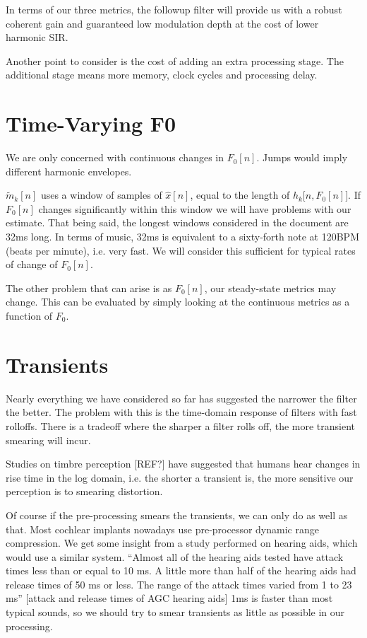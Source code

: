 \documentclass [11pt, proquest] {uwthesis}[2015/03/03]
\begin{document}
In terms of our three metrics, the followup filter will provide us with a robust coherent gain and guaranteed low modulation depth at the cost of lower harmonic SIR.

Another point to consider is the cost of adding an extra processing stage.  The additional stage means more memory, clock cycles and processing delay.


\section{Time-Varying F0}

We are only concerned with continuous changes in $F_0[n]$.  Jumps would imply different harmonic envelopes.

$\tilde{m}_k[n]$ uses a window of samples of $\widehat{x}[n]$, equal to the length of $h_k\big[n,F_0[n]\big]$.  If $F_0[n]$ changes significantly within this window we will have problems with our estimate.  That being said, the longest windows considered in the document are 32ms long.  In terms of music, 32ms is equivalent to a sixty-forth note at 120BPM (beats per minute), i.e. very fast.  We will consider this sufficient for typical rates of change of $F_0[n]$.

The other problem that can arise is as $F_0[n]$, our steady-state metrics may change.  This can be evaluated by simply looking at the continuous metrics as a function of $F_0$.

\section{Transients}\label{section:transients}

Nearly everything we have considered so far has suggested the narrower the filter the better.  The problem with this is the time-domain response of filters with fast rolloffs.  There is a tradeoff where the sharper a filter rolls off, the more transient smearing will incur.

Studies on timbre perception [REF?] have suggested that humans hear changes in rise time in the log domain, i.e. the shorter a transient is, the more sensitive our perception is to smearing distortion.

Of course if the pre-processing smears the transients, we can only do as well as that.  Most cochlear implants nowadays use pre-processor dynamic range compression.  We get some insight from a study performed on hearing aids, which would use a similar system.  ``Almost all of the hearing aids tested have attack times less than or equal to 10 ms. A little more than half of the hearing aids had release times of 50 ms or less.  The range of the attack times varied from 1 to 23 ms'' [attack and release times of AGC hearing aids]  1ms is faster than most typical sounds, so we should try to smear transients as little as possible in our processing.
\end{document}
